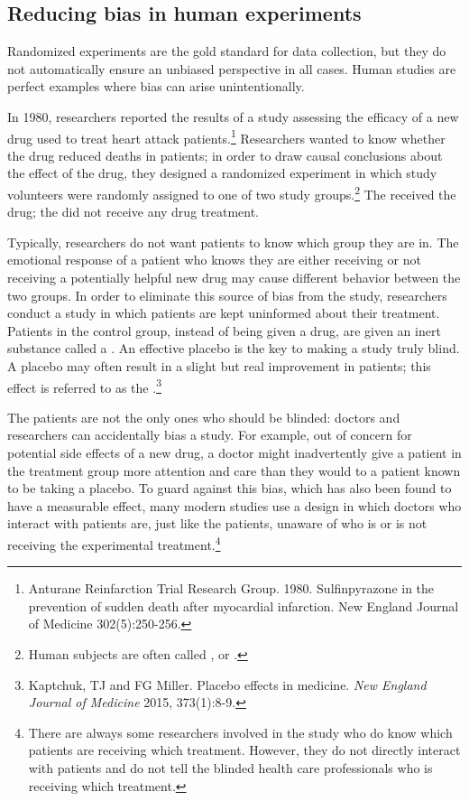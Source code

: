 
\subsection{Reducing bias in human experiments}
\label{biasInHumanExperiments}

Randomized experiments are the gold standard for data collection, but they do not automatically ensure an unbiased perspective in all cases. Human studies are perfect examples where bias can arise unintentionally. 

In 1980, researchers reported the results of a study assessing the efficacy of a new drug used to treat heart attack patients.\footnote{Anturane Reinfarction Trial Research Group. 1980. Sulfinpyrazone in the prevention of sudden death after myocardial infarction. New England Journal of Medicine 302(5):250-256.} Researchers wanted to know whether the drug reduced deaths in patients; in order to draw causal conclusions about the effect of the drug, they designed a randomized experiment in which study volunteers were randomly assigned to one of two study groups.\footnote{Human subjects are often called , or .} The  received the drug; the  did not receive any drug treatment.

Typically, researchers do not want patients to know which group they are in. The emotional response of a patient who knows they are either receiving or not receiving a potentially helpful new drug may cause different behavior between the two groups. In order to eliminate this source of bias from the study, researchers conduct a  study in which patients are kept uninformed about their treatment. Patients in the control group, instead of being given a drug, are given an inert substance called a . An effective placebo is the key to making a study truly blind. A placebo may often result in a slight but real improvement in patients; this effect is referred to as the .\footnote{Kaptchuk, TJ and FG Miller. Placebo effects in medicine. \textit{New England Journal of Medicine} 2015, 373(1):8-9.}

The patients are not the only ones who should be blinded: doctors and researchers can accidentally bias a study. For example, out of concern for potential side effects of a new drug, a doctor might inadvertently give a patient in the treatment group more attention and care than they would to a patient known to be taking a placebo. To guard against this bias, which has also been found to have a measurable effect, many modern studies use a  design in which doctors who interact with patients are, just like the patients, unaware of who is or is not receiving the experimental treatment.\footnote{There are always some researchers involved in the study who do know which patients are receiving which treatment. However, they do not directly interact with patients and do not tell the blinded health care professionals who is receiving which treatment.}

